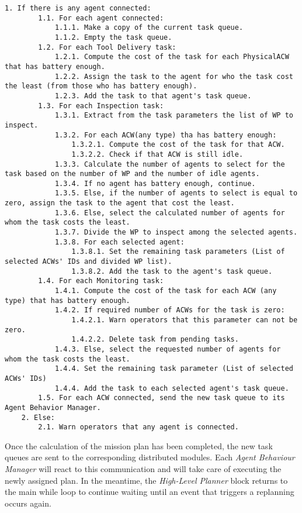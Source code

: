 \begin{lstlisting}[caption={Simplified task planning function's pseudocode}, breaklines=true, label=ps:performTaskAllocation]
	1. If there is any agent connected:
		1.1. For each agent connected:
			1.1.1. Make a copy of the current task queue.
			1.1.2. Empty the task queue.
		1.2. For each Tool Delivery task:
			1.2.1. Compute the cost of the task for each PhysicalACW that has battery enough.
			1.2.2. Assign the task to the agent for who the task cost the least (from those who has battery enough).
			1.2.3. Add the task to that agent's task queue.
		1.3. For each Inspection task:
			1.3.1. Extract from the task parameters the list of WP to inspect.
			1.3.2. For each ACW(any type) tha has battery enough:
				1.3.2.1. Compute the cost of the task for that ACW. 
				1.3.2.2. Check if that ACW is still idle.
			1.3.3. Calculate the number of agents to select for the task based on the number of WP and the number of idle agents.
			1.3.4. If no agent has battery enough, continue.
			1.3.5. Else, if the number of agents to select is equal to zero, assign the task to the agent that cost the least.
			1.3.6. Else, select the calculated number of agents for whom the task costs the least.
			1.3.7. Divide the WP to inspect among the selected agents.
			1.3.8. For each selected agent:
				1.3.8.1. Set the remaining task parameters (List of selected ACWs' IDs and divided WP list).
				1.3.8.2. Add the task to the agent's task queue.
		1.4. For each Monitoring task:
			1.4.1. Compute the cost of the task for each ACW (any type) that has battery enough.
			1.4.2. If required number of ACWs for the task is zero:
				1.4.2.1. Warn operators that this parameter can not be zero.
				1.4.2.2. Delete task from pending tasks.
			1.4.3. Else, select the requested number of agents for whom the task costs the least.
			1.4.4. Set the remaining task parameter (List of selected ACWs' IDs)
			1.4.4. Add the task to each selected agent's task queue.
		1.5. For each ACW connected, send the new task queue to its Agent Behavior Manager.
	2. Else:
		2.1. Warn operators that any agent is connected.
\end{lstlisting}

Once the calculation of the mission plan has been completed, the new task queues are sent to the corresponding distributed modules. Each \emph{Agent Behaviour Manager} will react to this communication and will take care of executing the newly assigned plan. In the meantime, the \emph{High-Level Planner} block returns to the main while loop to continue waiting until an event that triggers a replanning occurs again.

